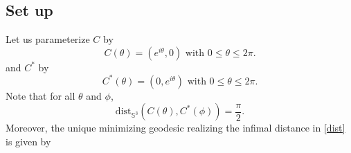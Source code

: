 \documentclass[11pt, reqno]{amsart}
\numberwithin{equation}{section}
\begin{document}
\subsection{Set up}
Let us parameterize $C$ by
\begin{equation}
C(\theta)= (e^{i\theta},0)\mbox{ with } 0\leq\theta\leq 2\pi.
\end{equation}
and $C^*$ by
\begin{equation}
C^*(\theta)= (0,e^{i\theta})\mbox{ with } 0\leq\theta\leq 2\pi.
\end{equation}
Note that for all $\theta$ and $\phi$, 
\begin{equation}\label{dist}
\mbox{dist}_{\mathbb{S}^3}(C(\theta),C^*(\phi))=\frac{\pi}{2}.
\end{equation} 
Moreover, the unique minimizing geodesic realizing the infimal distance in \eqref{dist} is given by 
\end{document}
